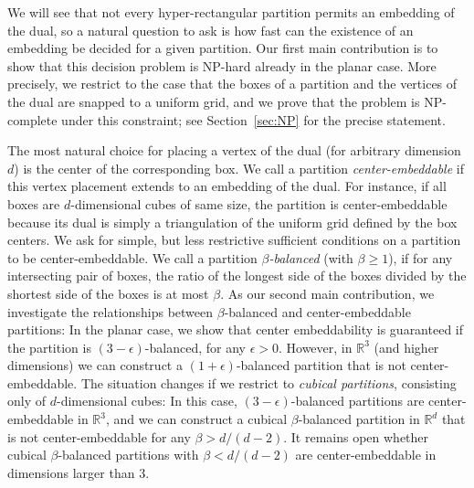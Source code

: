 \documentclass[12pt]{article}
\newcommand{\R}{\mathbb{R}}
\newcommand{\eps}{\epsilon}
\begin{document}
We will see that not every hyper-rectangular partition permits an embedding of the dual,
so a natural question to ask is how fast can the existence of an embedding 
be decided for a given partition.
Our first main contribution is to show that this decision problem 
is NP-hard already in the planar case. More precisely, we restrict to the case that
the boxes of a partition and the vertices of the dual
are snapped to a uniform grid, and we prove that the problem
is NP-complete under this constraint; 
see Section~\ref{sec:NP} for the precise statement.

The most natural choice for placing a vertex of the dual (for arbitrary dimension $d$)
is the center of the corresponding box. 
We call a partition \emph{center-embeddable} if this vertex placement extends
to an embedding of the dual.
For instance, if all boxes are $d$-dimensional cubes of same size,
the partition is center-embeddable because its dual is simply a triangulation
of the uniform grid defined by the box centers.
We ask for simple, but less restrictive 
sufficient conditions on a partition to be center-embeddable.
We call a partition \emph{$\beta$-balanced} (with $\beta\geq 1$), if for any intersecting pair of
boxes, the ratio of the longest side of the boxes
divided by the shortest side of the boxes is at most $\beta$.
As our second main contribution, we investigate the relationships between $\beta$-balanced
and center-embeddable partitions:
In the planar case, we show that center embeddability is guaranteed 
if the partition is $(3-\eps)$-balanced, for any $\eps>0$. However, in $\R^3$ (and higher dimensions)
we can construct a $(1+\eps)$-balanced partition that is not center-embeddable. 
The situation changes if we restrict to \emph{cubical partitions}, consisting
only of $d$-dimensional cubes: In this case, $(3-\eps)$-balanced partitions are center-embeddable
in $\R^3$, and we can construct a cubical $\beta$-balanced partition in $\R^d$ 
that is not center-embeddable for any $\beta>d/(d-2)$. 
It remains open whether cubical $\beta$-balanced partitions with $\beta<d/(d-2)$
are center-embeddable in dimensions larger than $3$.
\end{document}
